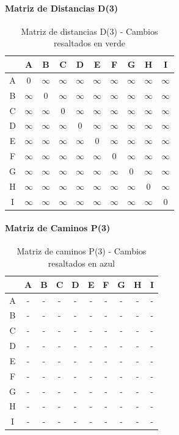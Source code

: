 \documentclass[12pt]{article}
\begin{document}
\paragraph{Matriz de Distancias D(3)}
\begin{table}[h!]
\centering
\begin{tabular}{|c|c|c|c|c|c|c|c|c|c|}
\hline
 & A & B & C & D & E & F & G & H & I \\\hline
A & 0 & $\infty$ & $\infty$ & $\infty$ & $\infty$ & $\infty$ & $\infty$ & $\infty$ & $\infty$ \\\hline
B & $\infty$ & 0 & $\infty$ & $\infty$ & $\infty$ & $\infty$ & $\infty$ & $\infty$ & $\infty$ \\\hline
C & $\infty$ & $\infty$ & 0 & $\infty$ & $\infty$ & $\infty$ & $\infty$ & $\infty$ & $\infty$ \\\hline
D & $\infty$ & $\infty$ & $\infty$ & 0 & $\infty$ & $\infty$ & $\infty$ & $\infty$ & $\infty$ \\\hline
E & $\infty$ & $\infty$ & $\infty$ & $\infty$ & 0 & $\infty$ & $\infty$ & $\infty$ & $\infty$ \\\hline
F & $\infty$ & $\infty$ & $\infty$ & $\infty$ & $\infty$ & 0 & $\infty$ & $\infty$ & $\infty$ \\\hline
G & $\infty$ & $\infty$ & $\infty$ & $\infty$ & $\infty$ & $\infty$ & 0 & $\infty$ & $\infty$ \\\hline
H & $\infty$ & $\infty$ & $\infty$ & $\infty$ & $\infty$ & $\infty$ & $\infty$ & 0 & $\infty$ \\\hline
I & $\infty$ & $\infty$ & $\infty$ & $\infty$ & $\infty$ & $\infty$ & $\infty$ & $\infty$ & 0 \\\hline
\end{tabular}
\caption{Matriz de distancias D(3) - Cambios resaltados en verde}
\end{table}

\paragraph{Matriz de Caminos P(3)}
\begin{table}[h!]
\centering
\begin{tabular}{|c|c|c|c|c|c|c|c|c|c|}
\hline
 & A & B & C & D & E & F & G & H & I \\\hline
A & - & - & - & - & - & - & - & - & - \\\hline
B & - & - & - & - & - & - & - & - & - \\\hline
C & - & - & - & - & - & - & - & - & - \\\hline
D & - & - & - & - & - & - & - & - & - \\\hline
E & - & - & - & - & - & - & - & - & - \\\hline
F & - & - & - & - & - & - & - & - & - \\\hline
G & - & - & - & - & - & - & - & - & - \\\hline
H & - & - & - & - & - & - & - & - & - \\\hline
I & - & - & - & - & - & - & - & - & - \\\hline
\end{tabular}
\caption{Matriz de caminos P(3) - Cambios resaltados en azul}
\end{table}
\end{document}
